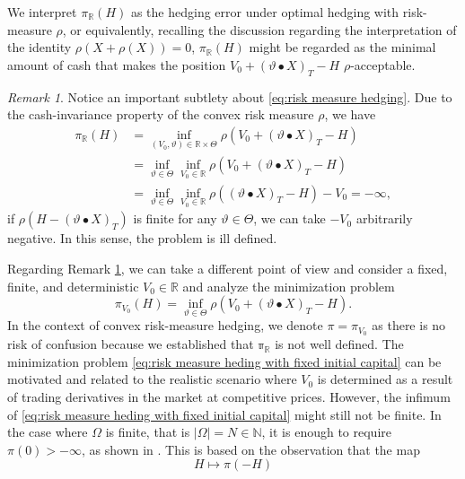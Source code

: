 \documentclass[11pt,a4paper,twoside,openany]{report}
\numberwithin{equation}{section}
\theoremstyle{plain} %
\theoremstyle{definition} %
\theoremstyle{remark} %
\newtheorem{remark}[theorem]{Remark}
\let\parencite\authnumparencite
\begin{document}
We interpret \(\pi_{\mathbb{R}}(H)\) as the hedging error under optimal hedging with risk-measure \(\rho\), or equivalently, recalling the discussion regarding the interpretation of the identity \(\rho(X+\rho(X))=0\), \(\pi_{\mathbb{R}}(H)\) might be regarded as the minimal amount of cash that makes the position \(V_0+(\vartheta\bullet X)_T-H\) \(\rho\)-acceptable. 
\begin{remark}\label{rem:ill posed problem}
Notice an important subtlety about \eqref{eq:risk measure hedging}. Due to the cash-invariance property of the convex risk measure \(\rho\), we have 
\begin{align*}
    \pi_{\mathbb{R}}(H) &= \inf_{(V_0,\vartheta)\in\mathbb{R}\times \Theta}\rho\left(V_0+(\vartheta\bullet X)_T-H\right)\\
    &=\inf_{\vartheta\in \Theta}\inf_{V_0\in\mathbb{R}}\rho\left(V_0+(\vartheta\bullet X)_T-H\right)\\
    &=\inf_{\vartheta\in \Theta}\inf_{V_0\in\mathbb{R}}\rho\left((\vartheta\bullet X)_T-H\right)-V_0=-\infty,
\end{align*}
if \(\rho\left(H-(\vartheta\bullet X)_T\right)\) is finite for any \(\vartheta\in\Theta\),
 we can take \(-V_0\) arbitrarily negative. In this sense, the problem is ill defined. 
\end{remark}
Regarding Remark \ref{rem:ill posed problem}, 
we can take a different point of view and consider a fixed, finite, and deterministic \(V_0\in\mathbb{R}\) and analyze the minimization problem 
\begin{equation}\label{eq:risk measure heding with fixed initial capital}
    \pi_{V_0}(H)=\inf_{\vartheta\in\Theta}\rho\left(V_0+(\vartheta\bullet X)_T-H\right).
\end{equation}
In the context of convex risk-measure hedging, we denote \(\pi=\pi_{V_0}\) as there is no risk of confusion because we established that \(\mathbb{\pi}_{\mathbb{R}}\) is not well defined. 
The minimization problem \eqref{eq:risk measure heding with fixed initial capital} can be motivated and related to the realistic scenario where \(V_0\) is determined as a result of trading derivatives in the market at competitive prices. However, the infimum of \eqref{eq:risk measure heding with fixed initial capital} might still not be finite.  In the case where \(\Omega\) is finite, that is \(|\Omega|=N\in\mathbb{N}\), it is enough to require \(\pi(0)>-\infty\), as shown in \parencite[Cor.~3.5.]{Buehler2018DeepHedging}. This is based on the observation that the map 
\begin{equation*}
    H\mapsto \pi(-H)
\end{equation*}
\end{document}
